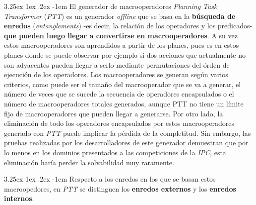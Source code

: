 \documentclass{article}
\makeatletter
\newcommand{\comment}[1]{}
\newcounter{subsubsubsection}
\renewcommand\paragraph{\@startsection{paragraph}{5}{\z@}%
      {3.25ex \@plus1ex \@minus.2ex}%
      {-1em}%
      {\normalfont\normalsize\bfseries}}
\makeatother
\begin{document}
    \comment{Incluir definición de generadores de macros online y offline}
    \setcounter{subsubsubsection}{0}
    \paragraph{}
    El generador de macrooperadores \textit{Planning Task Transformer} (\textit{PTT})\cite{chrpa2010generation} es un generador \textit{offline} que se basa en la \textbf{búsqueda de enredos} (\textit{entanglements}) -es decir, la relación de los operadores y los predicados- \textbf{que pueden luego llegar a convertirse en macrooperadores}. A su vez estos macrooperadores son aprendidos a partir de los planes, pues es en estos planes donde se puede observar por ejemplo si dos acciones que actualmente no son adyacentes pueden llegar a serlo mediante permutaciones del órden de ejecución de los operadores. Los macrooperadores se generan según varios criterios, como puede ser el tamaño del macrooperador que se va a generar, el número de veces que se sucede la secuencia de operadores encapsulados o el número de macrooperadores totales generados, aunque PTT no tiene un límite fijo de macrooperadores que pueden llegar a generarse. Por otro lado, la eliminación de todo los operadores encapsulados por estos macrooperadores generado con \textit{PTT} puede implicar la pérdida de la completitud. Sin embargo, las pruebas realizadas por los desarrolladores de este generador demuestran que por lo menos en los dominios presentados a las competiciones de la \textit{IPC}, esta eliminación haría perder la solvabilidad muy raramente.
    
    \paragraph{}
    Respecto a los enredos en los que se basan estos macroopedores, en \textit{PTT} se distinguen los \textbf{enredos externos} y los \textbf{enredos internos}.
    
\end{document}
